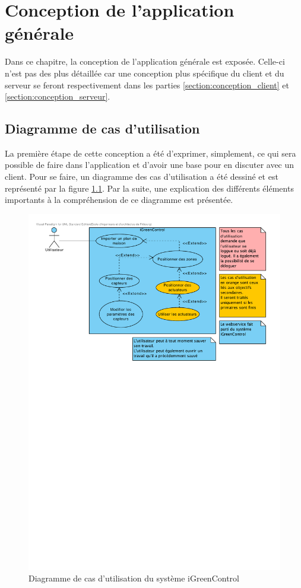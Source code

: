 \chapter{Conception de l'application générale}
Dans ce chapitre, la conception de l'application générale est exposée. Celle-ci n'est pas des plus détaillée car une conception plus spécifique du client et du serveur se feront respectivement dans les parties \ref{section:conception_client} et \ref{section:conception_serveur}.

\section{Diagramme de cas d'utilisation} %
\label{sec:diagramme_de_cas_d_utilisation}

La première étape de cette conception a été d'exprimer, simplement, ce qui sera possible de faire dans l'application et d'avoir une base pour en discuter avec un client. Pour se faire, un diagramme des cas d'utilisation a été dessiné et est représenté par la figure \ref{gra:usecase}. Par la suite, une explication des différents éléments importants à la compréhension de ce diagramme est présentée.

\begin{figure}[H]
    	\centering
    	\includegraphics[width=\textwidth]{00_media/04_diagramme_usecase.pdf}
    	\caption{Diagramme de cas d'utilisation du système iGreenControl}
    	\label{gra:usecase}
\end{figure}


